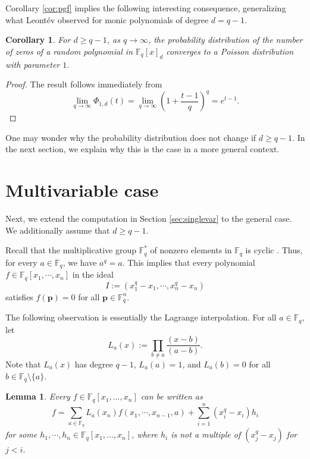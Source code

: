 \documentclass[12pt]{amsart}
\newtheorem{corollary}[theorem]{Corollary}
\newtheorem{lemma}[theorem]{Lemma}
\theoremstyle{definition}
\newcommand{\FF}{\mathbb{F} }
\newcommand{\bp}{\mathbf{p} }
\begin{document}
Corollary \ref{cor:pgf} implies the following interesting consequence, generalizing what Leont\'ev observed for monic polynomials of degree $d = q-1$.

\begin{corollary}\label{cor:poisson}
For $d \ge q-1$, as $q \to \infty$, the probability distribution of the number of zeros of a random polynomial in $\FF_q[x]_d$ converges to a Poisson distribution with parameter $1$.
\end{corollary}
\begin{proof}
The result follows immediately from 
\[
    \lim_{q \to \infty} \Phi_{1,d}(t) = \lim_{q \to \infty}\left(1+\frac{t-1}{q}\right)^q = e^{t-1}.
\]
\end{proof}

One may wonder why the probability distribution does not change if $d \ge q-1$. In the next section, we explain why this is the case in a more general context. 


\section{Multivariable case}\label{sec:multivar}

Next, we extend the computation in Section \ref{sec:singlevar} to the general case. We additionally assume that $d \ge q-1$.

Recall that the multiplicative group $\FF_q^*$ of nonzero elements in $\FF_q$ is cyclic \cite[Theorem V.5.3]{Hun80}. Thus, for every $a \in \FF_q$, we have $a^q = a$. This implies that every polynomial $f \in \FF_q[x_1, \cdots, x_n]$ in the ideal 
\begin{equation}\label{eqn:idealforzerofunctions}
    I := (x_1^q - x_1, \cdots, x_n^q - x_n)
\end{equation}
satisfies $f(\bp) = 0$ for all $\bp \in \FF_q^n$.

The following observation is essentially the Lagrange interpolation. For all $a \in \FF_q$, let 
\begin{equation}\label{eqn:Lpolynomial}
L_a(x) := \prod_{b \ne a}\frac{(x-b)}{(a-b)}.
\end{equation}
Note that $L_a(x)$ has degree $q-1$, $L_a(a) = 1$, and $L_a(b) = 0$ for all $b \in \FF_q \setminus \{a\}$. 

\begin{lemma}\label{lem:interpolation1}
Every $f \in \FF_q[x_1,..., x_n]$ can be written as
\begin{equation}\label{eqn:interpolation}
f = \sum_{a \in \FF_q}L_a(x_n)f(x_1,\cdots, x_{n-1}, a) + \sum_{i=1}^{n}(x_i^q-x_i)h_i
\end{equation}
for some $h_1, \cdots, h_n \in \FF_q[x_1,..., x_n]$, where $h_i$ is not a multiple of $(x_j^q-x_j)$ for $j < i$.
\end{lemma}
\end{document}
